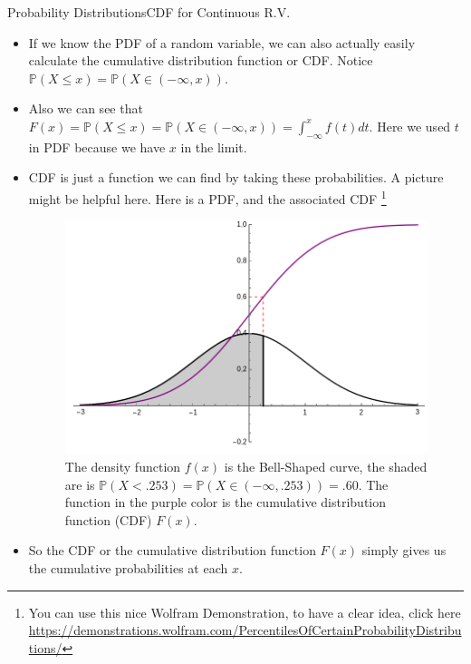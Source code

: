 \documentclass[8pt, usepdftitle=false]{beamer}
\begin{document}
\begin{frame}[allowframebreaks]{Probability Distributions}{CDF for Continuous R.V.}

\begin{itemize}
\item  If we know the PDF of a random variable, we can also actually easily calculate the cumulative distribution function or CDF. Notice $\mathbb{P}(X \leq x) = \mathbb{P}(X \in (-\infty, x) )$.

\item Also we can see that $F(x) = \mathbb{P}(X \leq x) = \mathbb{P}(X \in (-\infty, x) ) = \int_{-\infty}^{x} f(t) dt$. Here we used $t$ in PDF because we have $x$ in the limit.

\item CDF is just a function we can find by taking these probabilities. A picture might be helpful here. Here is a PDF, and the associated CDF \footnote[frame]{You can use this nice Wolfram Demonstration, to have a clear idea, click here \url{https://demonstrations.wolfram.com/PercentilesOfCertainProbabilityDistributions/}}

\begin{figure}
\centering
\includegraphics[scale = .25]{Images/PDF_CDF.png}
\caption{The density function $f(x)$ is the Bell-Shaped curve, the shaded are is $\mathbb{P}(X < .253) = \mathbb{P}(X \in (-\infty, .253)) = .60$. The function in the purple color is the cumulative distribution function (CDF) $F(x)$.}
\end{figure}

\item So the CDF or the cumulative distribution function $F(x)$ simply gives us the cumulative probabilities at each $x$.



\end{itemize}
\end{frame}
\end{document}
